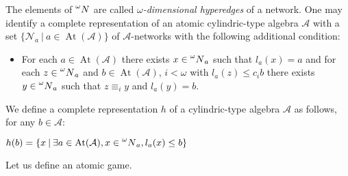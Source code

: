 \documentclass[a4paper]{article}
\theoremstyle{defin}
\theoremstyle{theorem}
\theoremstyle{prop}
\theoremstyle{lemma}
\theoremstyle{fact}
\theoremstyle{ex}
\theoremstyle{col}
\begin{document}
The elements of $\prescript{\omega}{}N$ are called \emph{$\omega$-dimensional hyperedges} of a network. One may identify a complete representation of an atomic cylindric-type algebra $\mathcal{A}$
with a set $\{ \mathcal{N}_a \: | \: a \in \operatorname{At}(\mathcal{A}) \}$ of $\mathcal{A}$-networks with the following additional condition:
\begin{itemize}
  \item For each $a \in \operatorname{At}(\mathcal{A})$ there exists $x \in \prescript{\omega}{}N_a$ such that $l_a(x) = a$ and for each $z \in \prescript{\omega}{}N_a$ and $b \in \operatorname{At}(\mathcal{A})$, $i < \omega$ with $l_a(z) \leq c_i b$
  there exists $y \in \prescript{\omega}{}N_a$ such that $z \equiv_i y$ and $l_a(y) = b$.
\end{itemize}

We define a complete representation $h$ of a cylindric-type algebra $\mathcal{A}$ as follows, for any $b \in \mathcal{A}$:
\begin{center}
$h(b) = \{ x \: | \: \exists a \in \operatorname{At}(\mathcal{A}), x \in \prescript{\omega}{}N_a, l_a(x) \leq b \}$
\end{center}

Let us define an atomic game.
\end{document}
